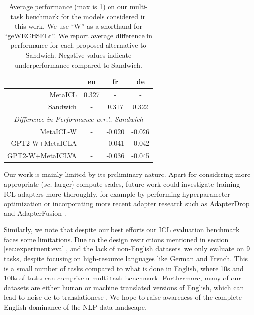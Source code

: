 \documentclass[11pt]{article}
\begin{document}
\begin{table}[ht]
	\centering
	\caption{Average performance (max is 1) on our multi-task benchmark for the models considered in
		this work. We use ``W'' as a shorthand for ``geWECHSELt''. We report average difference in
		performance for each proposed alternative to Sandwich. Negative values indicate underperformance
		compared to Sandwich.}
	\label{tab:results-summary}
	\begin{tabular}{@{}rccc@{}}
		\toprule
		\multicolumn{1}{c}{} & en    & fr     & de                             \\ \midrule
		MetaICL              & 0.327 & -      & -                              \\
		Sandwich             & -     & 0.317  & 0.322                          \\ \midrule
		\multicolumn{4}{c}{\textit{Difference in Performance w.r.t. Sandwich}} \\
		MetaICL-W            & -     & -0.020 & -0.026                         \\
		GPT2-W+MetaICLA      & -     & -0.041 & -0.042                         \\
		GPT2-W+MetaICLVA     & -     & -0.036 & -0.045                         \\ \bottomrule
	\end{tabular}
\end{table}

Our work is mainly limited by its preliminary nature. Apart for considering more appropriate
(\textit{sc.} larger) compute scales, future work could investigate training ICL-adapters more
thoroughly, for example by performing hyperparameter optimization or incorporating more recent
adapter research such as AdapterDrop \citep{ruckle_adapterdrop_2021} and AdapterFusion
\citep{pfeiffer_adapterfusion_2021}.

Similarly, we note that despite our best efforts our ICL evaluation benchmark faces some
limitations. Due to the design restrictions mentioned in section \ref{sec:experiment:eval}, and the
lack of non-English datasets, we only evaluate on 9 tasks, despite focusing on high-resource
languages like German and French. This is a small number of tasks compared to what is done in
English, where 10s and 100s of tasks can comprise a multi-task benchmark. Furthermore, many of our
datasets are either human or machine translated versions of English, which can lead to noise de to
translationese \citep{koppel_translationese_2011}. We hope to raise awareness of the complete
English dominance of the NLP data landscape.
\end{document}
